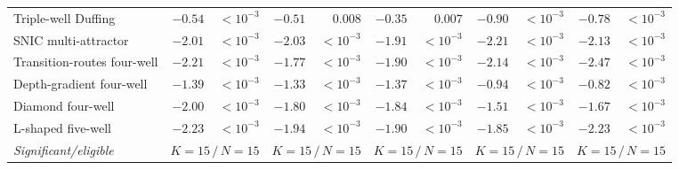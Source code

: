\begin{tabular}{@{}l rr rr rr rr rr@{}}
Triple-well Duffing & $\mathbf{-0.54}$ & $<\!10^{-3}$ & $\mathbf{-0.51}$ & $0.008$ & $\mathbf{-0.35}$ & $0.007$ & $\mathbf{-0.90}$ & $<\!10^{-3}$ & $\mathbf{-0.78}$ & $<\!10^{-3}$ \\
SNIC multi-attractor & $\mathbf{-2.01}$ & $<\!10^{-3}$ & $\mathbf{-2.03}$ & $<\!10^{-3}$ & $\mathbf{-1.91}$ & $<\!10^{-3}$ & $\mathbf{-2.21}$ & $<\!10^{-3}$ & $\mathbf{-2.13}$ & $<\!10^{-3}$ \\
Transition-routes four-well & $\mathbf{-2.21}$ & $<\!10^{-3}$ & $\mathbf{-1.77}$ & $<\!10^{-3}$ & $\mathbf{-1.90}$ & $<\!10^{-3}$ & $\mathbf{-2.14}$ & $<\!10^{-3}$ & $\mathbf{-2.47}$ & $<\!10^{-3}$ \\
Depth-gradient four-well & $\mathbf{-1.39}$ & $<\!10^{-3}$ & $\mathbf{-1.33}$ & $<\!10^{-3}$ & $\mathbf{-1.37}$ & $<\!10^{-3}$ & $\mathbf{-0.94}$ & $<\!10^{-3}$ & $\mathbf{-0.82}$ & $<\!10^{-3}$ \\
Diamond four-well & $\mathbf{-2.00}$ & $<\!10^{-3}$ & $\mathbf{-1.80}$ & $<\!10^{-3}$ & $\mathbf{-1.84}$ & $<\!10^{-3}$ & $\mathbf{-1.51}$ & $<\!10^{-3}$ & $\mathbf{-1.67}$ & $<\!10^{-3}$ \\
L-shaped five-well & $\mathbf{-2.23}$ & $<\!10^{-3}$ & $\mathbf{-1.94}$ & $<\!10^{-3}$ & $\mathbf{-1.90}$ & $<\!10^{-3}$ & $\mathbf{-1.85}$ & $<\!10^{-3}$ & $\mathbf{-2.23}$ & $<\!10^{-3}$ \\
\midrule
\emph{Significant/eligible} & \multicolumn{2}{c}{$K{=}15\,/\,N{=}15$} & \multicolumn{2}{c}{$K{=}15\,/\,N{=}15$} & \multicolumn{2}{c}{$K{=}15\,/\,N{=}15$} & \multicolumn{2}{c}{$K{=}15\,/\,N{=}15$} & \multicolumn{2}{c}{$K{=}15\,/\,N{=}15$} \\
\bottomrule
\end{tabular}